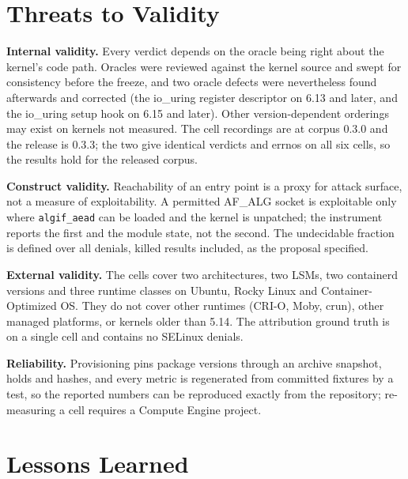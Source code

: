 \section{Threats to Validity}

\textbf{Internal validity.} Every verdict depends on the oracle being right about the kernel's code path. Oracles were reviewed against the kernel source and swept for consistency before the freeze, and two oracle defects were nevertheless found afterwards and corrected (the io\_uring register descriptor on 6.13 and later, and the io\_uring setup hook on 6.15 and later). Other version-dependent orderings may exist on kernels not measured. The cell recordings are at corpus 0.3.0 and the release is 0.3.3; the two give identical verdicts and errnos on all six cells, so the results hold for the released corpus.

\textbf{Construct validity.} Reachability of an entry point is a proxy for attack surface, not a measure of exploitability. A permitted AF\_ALG socket is exploitable only where \texttt{algif\_aead} can be loaded and the kernel is unpatched; the instrument reports the first and the module state, not the second. The undecidable fraction is defined over all denials, killed results included, as the proposal specified.

\textbf{External validity.} The cells cover two architectures, two LSMs, two containerd versions and three runtime classes on Ubuntu, Rocky Linux and Container-Optimized OS. They do not cover other runtimes (CRI-O, Moby, crun), other managed platforms, or kernels older than 5.14. The attribution ground truth is on a single cell and contains no SELinux denials.

\textbf{Reliability.} Provisioning pins package versions through an archive snapshot, holds and hashes, and every metric is regenerated from committed fixtures by a test, so the reported numbers can be reproduced exactly from the repository; re-measuring a cell requires a Compute Engine project.

\section{Lessons Learned}

